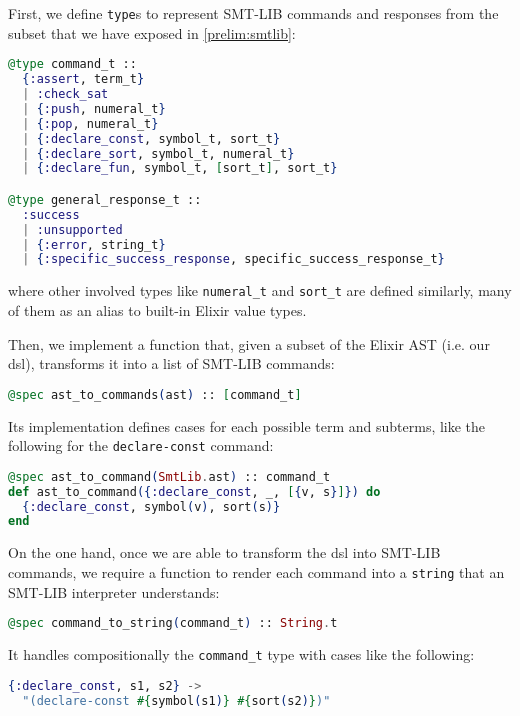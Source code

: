 First, we define \verb|type|s to represent SMT-LIB commands and responses
from the subset that we have exposed in \ref{prelim:smtlib}:

\begin{lstlisting}[language=elixir,numbers=none,frame=none]
@type command_t ::
  {:assert, term_t}
  | :check_sat
  | {:push, numeral_t}
  | {:pop, numeral_t}
  | {:declare_const, symbol_t, sort_t}
  | {:declare_sort, symbol_t, numeral_t}
  | {:declare_fun, symbol_t, [sort_t], sort_t}

@type general_response_t ::
  :success
  | :unsupported
  | {:error, string_t}
  | {:specific_success_response, specific_success_response_t}
\end{lstlisting}

where other involved types like \verb|numeral_t| and \verb|sort_t| are defined 
similarly, many of them as an alias to built-in Elixir value types.

Then, we implement a function that, given a subset of the 
Elixir AST (i.e. our \gls{dsl}), transforms it into a list of SMT-LIB commands:

\begin{lstlisting}[language=elixir,numbers=none,frame=none]
@spec ast_to_commands(ast) :: [command_t]
\end{lstlisting}
  
Its implementation defines cases for each possible term and subterms, 
like the following for the \verb|declare-const| command:

\begin{lstlisting}[language=elixir,numbers=none,frame=none]
@spec ast_to_command(SmtLib.ast) :: command_t
def ast_to_command({:declare_const, _, [{v, s}]}) do
  {:declare_const, symbol(v), sort(s)}
end
\end{lstlisting}

On the one hand, once we are able to transform the \gls{dsl} into SMT-LIB commands, 
we require a function to render each command into a \verb|string| that an SMT-LIB
interpreter understands:

\begin{lstlisting}[language=elixir,numbers=none,frame=none]
@spec command_to_string(command_t) :: String.t
\end{lstlisting}

It handles compositionally the \verb|command_t| type with cases like the
following:

\begin{lstlisting}[language=elixir,numbers=none,frame=none]
{:declare_const, s1, s2} ->
  "(declare-const #{symbol(s1)} #{sort(s2)})"
\end{lstlisting}

